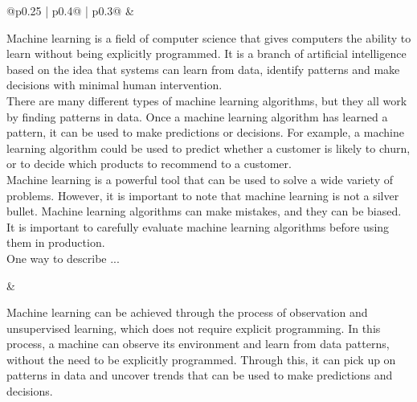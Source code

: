 \begin{table}[!ht]
\begin{tabular}{@{}p{0.25\textwidth} | p{0.4\textwidth}@{} | p{0.3\textwidth}@{}}
 & 
\begin{minipage}[t]{\linewidth}%
\raggedright
{\footnotesize 
Machine learning is a field of computer science that gives computers the ability to learn without being explicitly programmed. It is a branch of artificial intelligence based on the idea that systems can learn from data, identify patterns and make decisions with minimal human intervention.\\There are many different types of machine learning algorithms, but they all work by finding patterns in data. Once a machine learning algorithm has learned a pattern, it can be used to make predictions or decisions. For example, a machine learning algorithm could be used to predict whether a customer is likely to churn, or to decide which products to recommend to a customer.\\Machine learning is a powerful tool that can be used to solve a wide variety of problems. However, it is important to note that machine learning is not a silver bullet. Machine learning algorithms can make mistakes, and they can be biased. It is important to carefully evaluate machine learning algorithms before using them in production.\\One way to describe ...
}
\end{minipage}
& 
\begin{minipage}[t]{\linewidth}%
\raggedright
{\footnotesize Machine learning can be achieved through the process of observation and unsupervised learning, which does not require explicit programming. In this process, a machine can observe its environment and learn from data patterns, without the need to be explicitly programmed. Through this, it can pick up on patterns in data and uncover trends that can be used to make predictions and decisions.
}
\end{minipage} \\
\bottomrule
\end{tabular}
\end{table}




